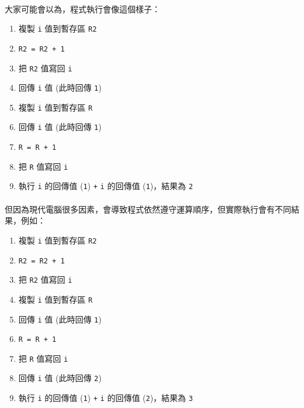 \documentclass[12pt,a4paper,oneside]{report}
\begin{document}
\begin{CJK}{UTF8}{bkai}
\paragraph{}大家可能會以為，程式執行會像這個樣子：
\begin{enumerate}
\item {\color{red}複製 \lstinline!i! 值到暫存區 \lstinline!R2!}
\item {\color{red}\lstinline!R2 = R2 + 1!}
\item {\color{red}把 \lstinline!R2! 值寫回 \lstinline!i!}
\item {\color{red}回傳 \lstinline!i! 值} (此時回傳 \lstinline!1!)
\item {\color{blue}複製 \lstinline!i! 值到暫存區 \lstinline!R!}
\item {\color{blue}回傳 \lstinline!i! 值} (此時回傳 \lstinline!1!)
\item {\color{blue}\lstinline!R = R + 1!}
\item {\color{blue}把 \lstinline!R! 值寫回 \lstinline!i!}
\item 執行 \lstinline!i! 的回傳值 ({\color{blue}\lstinline!1!}) \lstinline!+! \lstinline!i! 的回傳值 ({\color{red}\lstinline!1!})，結果為 \lstinline!2!
\end{enumerate}

\paragraph{}但因為現代電腦很多因素，會導致程式依然遵守運算順序，但實際執行會有不同結果，例如：
\begin{enumerate}
\item {\color{red}複製 \lstinline!i! 值到暫存區 \lstinline!R2!}
\item {\color{red}\lstinline!R2 = R2 + 1!}
\item {\color{red}把 \lstinline!R2! 值寫回 \lstinline!i!}
\item {\color{blue}複製 \lstinline!i! 值到暫存區 \lstinline!R!}
\item {\color{blue}回傳 \lstinline!i! 值} (此時回傳 \lstinline!1!)
\item {\color{blue}\lstinline!R = R + 1!}
\item {\color{blue}把 \lstinline!R! 值寫回 \lstinline!i!}
\item {\color{red}回傳 \lstinline!i! 值} (此時回傳 \lstinline!2!)
\item 執行 \lstinline!i! 的回傳值 ({\color{blue}\lstinline!1!}) \lstinline!+! \lstinline!i! 的回傳值 ({\color{red}\lstinline!2!})，結果為 \lstinline!3!
\end{enumerate}


\end{CJK}
\end{document}

